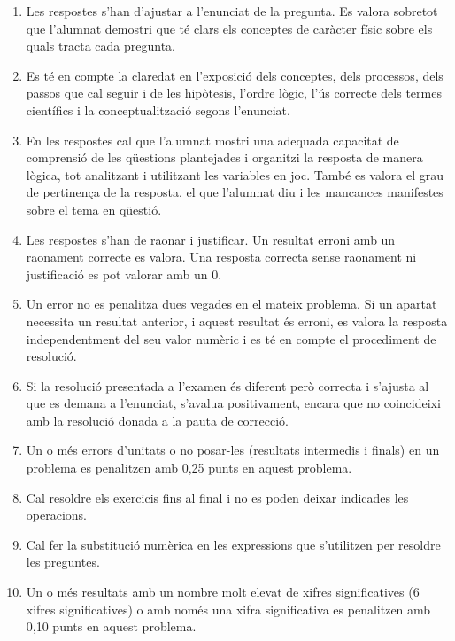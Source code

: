 \begin{enumerate}
  \item Les respostes s'han d'ajustar a l'enunciat de la pregunta. Es valora sobretot que l'alumnat demostri que té clars els conceptes de caràcter físic sobre els quals tracta cada pregunta.
  \item Es té en compte la claredat en l'exposició dels conceptes, dels processos, dels passos que cal seguir i de les hipòtesis, l'ordre lògic, l'ús correcte dels termes científics i la conceptualització segons l'enunciat.
  \item En les respostes cal que l'alumnat mostri una adequada capacitat de comprensió de les qüestions plantejades i organitzi la resposta de manera lògica, tot analitzant i utilitzant les variables en joc. També es valora el grau de pertinença de la resposta, el que l'alumnat diu i les mancances manifestes sobre el tema en qüestió.
  \item Les respostes s'han de raonar i justificar. Un resultat erroni amb un raonament correcte es valora. Una resposta correcta sense raonament ni justificació es pot valorar amb un 0.
  \item Un error no es penalitza dues vegades en el mateix problema. Si un apartat necessita un resultat anterior, i aquest resultat és erroni, es valora la resposta independentment del seu valor numèric i es té en compte el procediment de resolució.
  \item Si la resolució presentada a l'examen és diferent però correcta i s'ajusta al que es demana a l'enunciat, s'avalua positivament, encara que no coincideixi amb la resolució donada a la pauta de correcció.
  \item Un o més errors d'unitats o no posar-les (resultats intermedis i finals) en un problema es penalitzen amb 0,25 punts en aquest problema.
  \item Cal resoldre els exercicis fins al final i no es poden deixar indicades les operacions.
  \item Cal fer la substitució numèrica en les expressions que s'utilitzen per resoldre les preguntes.
  \item Un o més resultats amb un nombre molt elevat de xifres significatives (6 xifres significatives) o amb només una xifra significativa es penalitzen amb 0,10 punts en aquest problema.
\end{enumerate}
